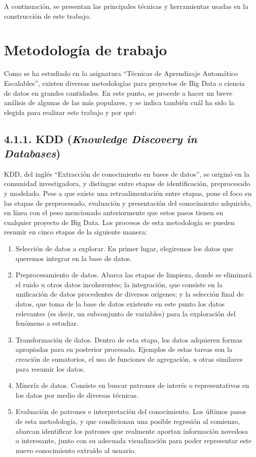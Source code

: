 
A continuación, se presentan las principales técnicas y herramientas usadas en la construcción de este trabajo.

\section{Metodología de trabajo}

Como se ha estudiado en la asignatura ``Técnicas de Aprendizaje Automático Escalables'', existen diversas metodologías para proyectos de Big Data o ciencia de datos en grandes cantidades. En este punto, se procede a hacer un breve análisis de algunas de las más populares, y se indica también cuál ha sido la elegida para realizar este trabajo y por qué:

\subsection{4.1.1. KDD (\textit{Knowledge Discovery in Databases})}

KDD, del inglés ``Extracción de conocimiento en bases de datos'', se originó en la comunidad investigadora, y distingue entre etapas de identificación, preprocesado y modelado. Pese a que existe una retroalimentación entre etapas, pone el foco en las etapas de preprocesado, evaluación y presentación del conocimiento adquirido, en línea con el peso mencionado anteriormente que estos pasos tienen en cualquier proyecto de Big Data. Los procesos de esta metodología se pueden resumir en cinco etapas de la siguiente manera:

\begin{enumerate}
    \item Selección de datos a explorar. En primer lugar, elegiremos los datos que queremos integrar en la base de datos.
    \item Preprocesamiento de datos. Abarca las etapas de limpieza, donde se eliminará el ruido u otros datos incoherentes; la integración, que consiste en la unificación de datos procedentes de diversos orígenes; y la selección final de datos, que toma de la base de datos existente en este punto los datos relevantes (es decir, un subconjunto de variables) para la exploración del fenómeno a estudiar.
    \item Transformación de datos. Dentro de esta etapa, los datos adquieren formas apropiadas para su posterior procesado. Ejemplos de estas tareas son la creación de sumatorios, el uso de funciones de agregación, u otras similares para resumir los datos.
    \item Minería de datos. Consiste en buscar patrones de interés o representativos en los datos por medio de diversas técnicas.
    \item Evaluación de patrones e interpretación del conocimiento. Los últimos pasos de esta metodología, y que condicionan una posible regresión al comienzo, abarcan identificar los patrones que realmente aportan información novedosa o interesante, junto con su adecuada visualización para poder representar este nuevo conocimiento extraído al usuario.
\end{enumerate}

